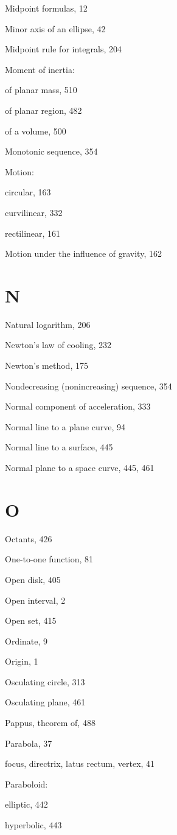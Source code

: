 \documentclass[10pt]{article}
\begin{document}
Midpoint formulas, 12

Minor axis of an ellipse, 42

Midpoint rule for integrals, 204

Moment of inertia:

of planar mass, 510

of planar region, 482

of a volume, 500

Monotonic sequence, 354

Motion:

circular, 163

curvilinear, 332

rectilinear, 161

Motion under the influence of gravity, 162

\section*{$\mathbf{N}$}
Natural logarithm, 206

Newton's law of cooling, 232

Newton's method, 175

Nondecreasing (nonincreasing) sequence, 354

Normal component of acceleration, 333

Normal line to a plane curve, 94

Normal line to a surface, 445

Normal plane to a space curve, 445, 461

\section*{O}
Octants, 426

One-to-one function, 81

Open disk, 405

Open interval, 2

Open set, 415

Ordinate, 9

Origin, 1

Osculating circle, 313

Osculating plane, 461

Pappus, theorem of, 488

Parabola, 37

focus, directrix, latus rectum, vertex, 41

Paraboloid:

elliptic, 442

hyperbolic, 443
\end{document}
